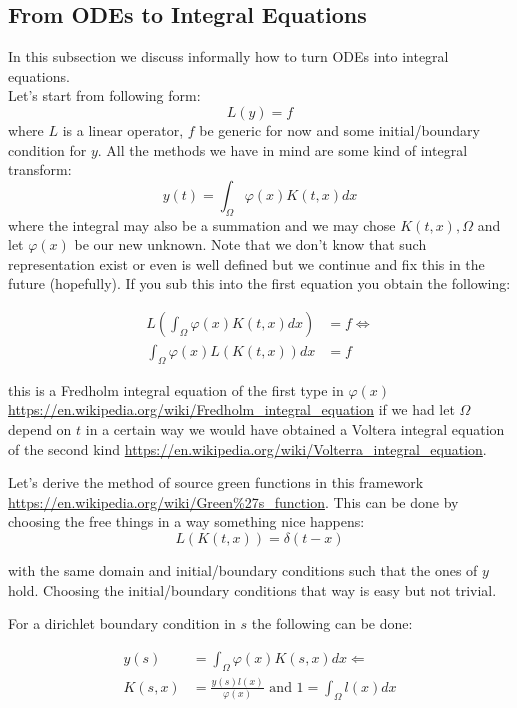 \documentclass[a4paper,12pt]{article}
\begin{document}
\subsection{From ODEs to Integral Equations}
In this subsection we discuss informally how to turn ODEs into integral equations. \\

Let's start from following form:
$$
    L(y)= f
$$
where $L$ is a linear operator, $f$ be generic for now and some initial/boundary condition
for $y$. All the methods we have in mind are some kind of integral transform:
$$
    y(t) = \int_{\Omega} \varphi(x) K(t,x)dx
$$
where the integral may also be a summation and we may chose $K(t,x), \Omega$ and let $\varphi(x)$ be our new unknown. Note that we don't know that such representation exist or even is well defined but we continue and fix this in the future (hopefully). If you sub this into the first equation you obtain the following:

\begin{align*}
    L \left(\int_{\Omega} \varphi(x) K(t,x)dx \right) & = f \Leftrightarrow \\
    \int_{\Omega} \varphi(x) L \left(K(t,x) \right)dx & = f
\end{align*}

this is a Fredholm integral equation of the first type in $\varphi(x)$
\url{https://en.wikipedia.org/wiki/Fredholm_integral_equation}
if we had
let $\Omega$ depend on $t$ in a certain way we would have obtained a Voltera integral
equation of the second kind
\url{https://en.wikipedia.org/wiki/Volterra_integral_equation}.

Let's derive the method of source green functions in this framework
\url{https://en.wikipedia.org/wiki/Green%27s_function}. 
This can be done by choosing the free things in a way something nice happens:
$$
    L \left(K(t,x) \right) = \delta(t-x)
$$

with the same  domain and initial/boundary conditions such that the ones of $y$ hold.
Choosing the initial/boundary conditions that way is easy but not trivial.

For a dirichlet boundary condition in $s$ the following can be done:

\begin{align*}
    y(s)   & = \int_{\Omega} \varphi(x) K(s,x)dx \Leftarrow                      \\
    K(s,x) & = \frac{y(s) l(x)}{\varphi(x)} \text{ and } 1 = \int_{\Omega}l(x)dx
\end{align*}
\end{document}
